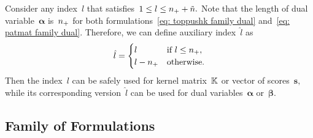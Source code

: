 \pagebreak

\begin{notation}\label{not: dual update rules}
  Consider any index~$l$ that satisfies~$1 \leq l \leq n_{+} + \tilde{n}.$ Note that the length of dual variable~$\bm{\alpha}$ is~$n_{+}$ for both formulations~\eqref{eq: toppushk family dual} and~\eqref{eq: patmat family dual}. Therefore, we can define auxiliary index~$\hat{l}$ as 
  \begin{equation*}
    \hat{l} = \begin{cases}
      l & \text{if } l \leq n_{+}, \\
      l - n_{+} & \text{otherwise}.
    \end{cases}
  \end{equation*}
  Then the index~$l$ can be safely used for kernel matrix~$\mathbb{K}$ or vector of scores~$\bm{s},$ while its corresponding version~$\hat{l}$ can be used for dual variables~$\bm{\alpha}$ or~$\bm{\beta}.$
\end{notation}

\subsection{Family of \TopPushK Formulations}\label{sec: Top coordinate descent}

